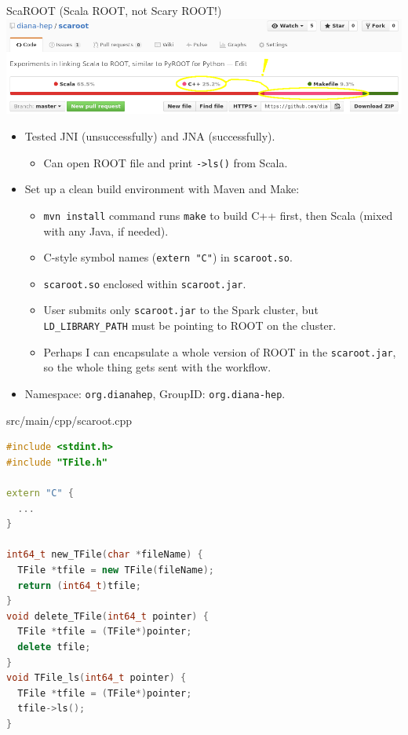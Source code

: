 \documentclass{beamer}
\begin{document}
\begin{frame}{ScaROOT {\small (Scala ROOT, not Scary ROOT!)}}
\includegraphics[width=\linewidth]{scaroot_languages.png}

\vspace{0.2 cm}
\begin{itemize}
\item Tested JNI (unsuccessfully) and JNA (successfully).
\begin{itemize}
\item Can open ROOT file and print {\tt ->ls()} from Scala.
\end{itemize}
\item Set up a clean build environment with Maven and Make:
\begin{itemize}
\item {\tt mvn install} command runs {\tt make} to build C++ first, then Scala (mixed with any Java, if needed).
\item C-style symbol names ({\tt extern "C"}) in {\tt scaroot.so}.
\item {\tt scaroot.so} enclosed within {\tt scaroot.jar}.
\item User submits only {\tt scaroot.jar} to the Spark cluster, but {\tt LD\_LIBRARY\_PATH} must be pointing to ROOT on the cluster.
\item Perhaps I can encapsulate a whole version of ROOT in the {\tt scaroot.jar}, so the whole thing gets sent with the workflow.
\end{itemize}
\item Namespace: {\tt org.dianahep}, GroupID: {\tt org.diana-hep}.
\end{itemize}
\end{frame}

\begin{frame}[fragile]{src/main/cpp/scaroot.cpp}
\small
\begin{lstlisting}[language=c++]
#include <stdint.h>
#include "TFile.h"

extern "C" {
  ...
}

int64_t new_TFile(char *fileName) {
  TFile *tfile = new TFile(fileName);
  return (int64_t)tfile;
}
void delete_TFile(int64_t pointer) {
  TFile *tfile = (TFile*)pointer;
  delete tfile;
}
void TFile_ls(int64_t pointer) {
  TFile *tfile = (TFile*)pointer;
  tfile->ls();
}
\end{lstlisting}
\end{frame}
\end{document}
